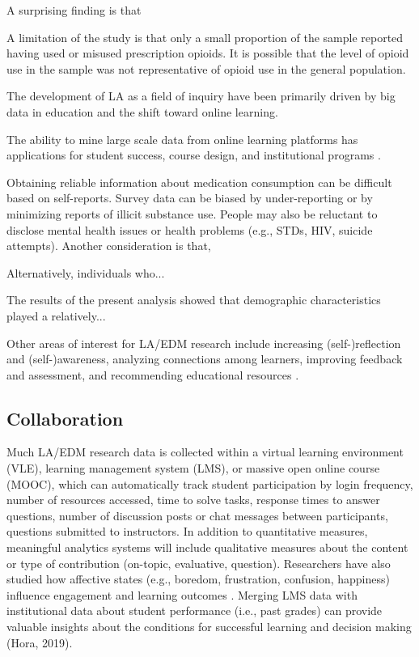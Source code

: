 \documentclass[sigconf]{acmart}
\begin{document}
A surprising finding is that 

A limitation of the study is that only a small proportion of the sample 
reported having used or misused prescription opioids. It is possible that the 
level of opioid use in the sample was not representative of opioid use in the 
general population. 

The development of LA as a field of 
inquiry have been primarily driven by big data in education and the shift 
toward online learning. 

 The ability to mine large scale data from online 
learning platforms has applications for student success, course design, and 
institutional programs \cite{Lester19}. 

Obtaining reliable information about medication consumption can be difficult 
based on self-reports. Survey data can be biased by under-reporting or by 
minimizing reports of illicit substance use. People may also be reluctant to 
disclose mental health issues or health problems (e.g., STDs, HIV, suicide 
attempts). Another consideration is that,


Alternatively, individuals who...

The results of the present analysis showed that demographic 
characteristics played a relatively...  

Other areas of interest for LA/EDM research include 
increasing (self-)reflection and (self-)awareness, analyzing connections among 
learners, improving feedback and assessment, and recommending educational 
resources \cite{lang17, lester19, papamitsiou14}.




\subsection{Collaboration}

Much LA/EDM research data is collected within a virtual learning 
environment (VLE), learning management system (LMS), or massive open online 
course (MOOC), which can automatically track student participation by login 
frequency, number of resources accessed, time to solve tasks, response times 
to answer questions, number of discussion posts or chat messages between 
participants, questions submitted to instructors. In addition to quantitative 
measures, meaningful analytics systems will include qualitative measures about 
the content or type of contribution (on-topic, evaluative, question). 
Researchers have also studied how affective states (e.g., boredom, 
frustration, confusion, happiness) influence engagement and learning outcomes 
\cite{pardos14}. Merging LMS data with institutional data about student 
performance (i.e., past grades) can provide valuable insights about the 
conditions for successful learning and decision making (Hora, 2019). 
\end{document}
